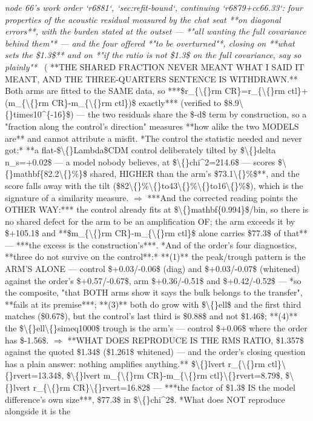 \begin{description}
\textit{node 66's work order `r6881`, `sec:refit-bound`, continuing `r6879+cc66.33`: four properties of the acoustic residual measured by the chat seat **on diagonal errors**, with the burden stated at the outset --- *"all wanting the full covariance behind them"* --- and the four offered *"to be overturned"*, closing on **what sets the \$1.3\$** and on *"if the ratio is not \$1.3\$ on the full covariance, say so plainly"*} \ ( **THE SHARED FRACTION NEVER MEANT WHAT I SAID IT MEANT, AND THE THREE-QUARTERS SENTENCE IS WITHDRAWN.** Both arms are fitted to the SAME data, so ***\$r\_\{\textbackslash\{\}rm CR\}=r\_\{\textbackslash\{\}rm ctl\}+(m\_\{\textbackslash\{\}rm CR\}-m\_\{\textbackslash\{\}rm ctl\})\$ exactly*** (verified to \$8.9\textbackslash\{\}times10\textasciicircum{}\{-16\}\$) --- the two residuals share the \$-d\$ term by construction, so a "fraction along the control's direction" measures **how alike the two MODELS are** and cannot attribute a misfit.  *The control the statistic needed and never got:* **a flat-\$\textbackslash\{\}Lambda\$CDM control deliberately tilted by \$\textbackslash\{\}delta n\_s=+0.02\$ --- a model nobody believes, at \$\textbackslash\{\}chi\textasciicircum{}2=214.6\$ --- scores \$\textbackslash\{\}mathbf\{82.2\textbackslash\{\}\%\}\$ shared, HIGHER than the arm's \$73.1\textbackslash\{\}\%\$**, and the score falls away with the tilt (\$82\textbackslash\{\}\%\textbackslash\{\}to43\textbackslash\{\}\%\textbackslash\{\}to16\textbackslash\{\}\%\$), which is the signature of a similarity measure. \ensuremath{\Rightarrow} ***And the corrected reading points the OTHER WAY:*** the control already fits at \$\textbackslash\{\}mathbf\{0.994\}\$/bin, so there is no shared defect for the arm to be an amplification OF; the arm exceeds it by \$+105.1\$ and **\$m\_\{\textbackslash\{\}rm CR\}-m\_\{\textbackslash\{\}rm ctl\}\$ alone carries \$77.3\$ of that** --- ***the excess is the construction's***.  *And of the order's four diagnostics, **three do not survive on the control**:* **(1)** the peak/trough pattern is the ARM'S ALONE --- control \$+0.03/-0.06\$ (diag) and \$+0.03/-0.07\$ (whitened) against the order's \$+0.57/-0.67\$, arm \$+0.36/-0.51\$ and \$+0.42/-0.52\$ ---  *so the composite, "that BOTH arms show it says the bulk belongs to the transfer", **fails at its premise***; **(3)** both do grow with \$\textbackslash\{\}ell\$ and the first third matches (\$0.67\$), but the control's last third is \$0.88\$ and not \$1.46\$; **(4)** the \$\textbackslash\{\}ell\textbackslash\{\}simeq1000\$ trough is the arm's --- control \$+0.06\$ where the order has \$-1.56\$. \ensuremath{\Rightarrow}  **WHAT DOES REPRODUCE IS THE RMS RATIO, \$1.357\$ against the quoted \$1.34\$ (\$1.261\$ whitened) --- and the order's closing question has a plain answer: nothing amplifies anything.** \$\textbackslash\{\}lvert r\_\{\textbackslash\{\}rm ctl\}\textbackslash\{\}rvert=13.34\$, \$\textbackslash\{\}lvert m\_\{\textbackslash\{\}rm CR\}-m\_\{\textbackslash\{\}rm ctl\}\textbackslash\{\}rvert=8.79\$, \$\textbackslash\{\}lvert r\_\{\textbackslash\{\}rm CR\}\textbackslash\{\}rvert=16.82\$ --- ***the factor of \$1.3\$ IS the model difference's own size***, \$77.3\$ in \$\textbackslash\{\}chi\textasciicircum{}2\$.  *What does NOT reproduce alongside it is the 
\end{description}
